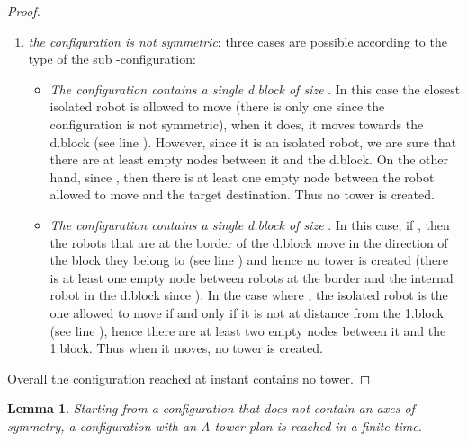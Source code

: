 \documentclass[12pt]{llncs}
\newtheorem{lem}{Lemma}
\begin{document}
\begin{proof}
\begin{enumerate}
\begin{itemize}
\end{itemize}
\item{\textit{the configuration is not symmetric}:} three cases are possible according to the type of the sub -configuration:
\begin{itemize}
\item{\textit{The configuration contains a single d.block of size }}. In this case the closest isolated robot is allowed to move (there is only one since the configuration is not symmetric), when it does, it moves towards the d.block (see line ). However, since it is an isolated robot, we are sure that there are at least  empty nodes between it and the d.block. On the other hand, since , then there is at least one empty node between the robot allowed to move and the target destination. Thus no tower is created.
\item{\textit{The configuration contains a single d.block of size }}. In this case, if , then the robots that are at the border of the d.block move in the direction of the block they belong to (see line ) and hence no tower is created (there is at least one empty node between robots at the border and the internal robot in the d.block since ). In the case where , the isolated robot is the one allowed to move if and only if it is not at distance  from the 1.block (see line ), hence there are at least two empty nodes between it and the 1.block. Thus when it moves, no tower is created.  
\end{itemize}
\end{enumerate}

Overall the configuration reached at instant  contains no tower.
\end{proof} 

\begin{lem}
\label{lem:nosym}
Starting from a configuration that does not contain an axes of symmetry, a configuration with an A-tower-plan is reached in a finite time. 
\end{lem}
\end{document}
